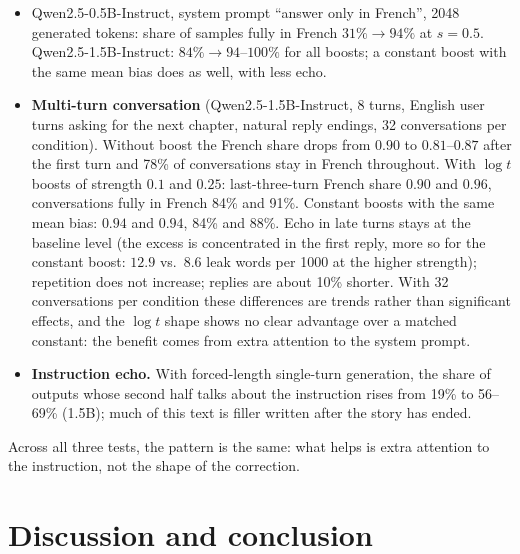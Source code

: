 \documentclass[11pt]{article}
\theoremstyle{definition}
\theoremstyle{remark}
\begin{document}
\begin{itemize}
  \item Qwen2.5-0.5B-Instruct, system prompt ``answer only in French'', 2048 generated tokens: share of samples fully in French $31\%\to94\%$ at $s=0.5$. Qwen2.5-1.5B-Instruct: $84\%\to94$--$100\%$ for all boosts; a constant boost with the same mean bias does as well, with less echo.
  \item \textbf{Multi-turn conversation} (Qwen2.5-1.5B-Instruct, 8 turns, English user turns asking for the next chapter, natural reply endings, 32 conversations per condition). Without boost the French share drops from $0.90$ to $0.81$--$0.87$ after the first turn and 78\% of conversations stay in French throughout. With $\log t$ boosts of strength $0.1$ and $0.25$: last-three-turn French share $0.90$ and $0.96$, conversations fully in French 84\% and 91\%. Constant boosts with the same mean bias: $0.94$ and $0.94$, 84\% and 88\%. Echo in late turns stays at the baseline level (the excess is concentrated in the first reply, more so for the constant boost: $12.9$ vs.\ $8.6$ leak words per 1000 at the higher strength); repetition does not increase; replies are about 10\% shorter. With 32 conversations per condition these differences are trends rather than significant effects, and the $\log t$ shape shows no clear advantage over a matched constant: the benefit comes from extra attention to the system prompt.
  \item \textbf{Instruction echo.} With forced-length single-turn generation, the share of outputs whose second half talks about the instruction rises from 19\% to 56--69\% (1.5B); much of this text is filler written after the story has ended.
\end{itemize}

Across all three tests, the pattern is the same: what helps is extra attention to the instruction, not the shape of the correction.

\section{Discussion and conclusion}
\label{sec:discussion}
\end{document}
